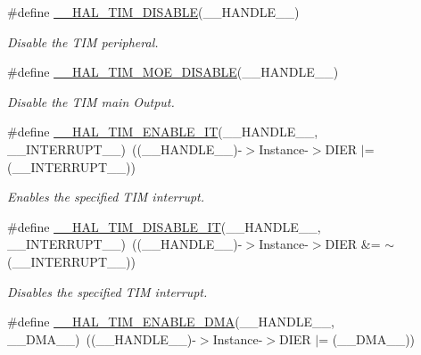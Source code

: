 \begin{DoxyCompactItemize}
\#define \hyperlink{group___t_i_m___exported___macros_ga6a5e653e0e06a04151b74eb1a5f96eb6}{\+\_\+\+\_\+\+H\+A\+L\+\_\+\+T\+I\+M\+\_\+\+D\+I\+S\+A\+B\+LE}(\+\_\+\+\_\+\+H\+A\+N\+D\+L\+E\+\_\+\+\_\+)
\begin{DoxyCompactList}\small\item\em Disable the T\+IM peripheral. \end{DoxyCompactList}\item 
\#define \hyperlink{group___t_i_m___exported___macros_ga69d63e147faeca8909e9679f684c0325}{\+\_\+\+\_\+\+H\+A\+L\+\_\+\+T\+I\+M\+\_\+\+M\+O\+E\+\_\+\+D\+I\+S\+A\+B\+LE}(\+\_\+\+\_\+\+H\+A\+N\+D\+L\+E\+\_\+\+\_\+)
\begin{DoxyCompactList}\small\item\em Disable the T\+IM main Output. \end{DoxyCompactList}\item 
\#define \hyperlink{group___t_i_m___exported___macros_ga4d69943bc4716743c78e3194e259097e}{\+\_\+\+\_\+\+H\+A\+L\+\_\+\+T\+I\+M\+\_\+\+E\+N\+A\+B\+L\+E\+\_\+\+IT}(\+\_\+\+\_\+\+H\+A\+N\+D\+L\+E\+\_\+\+\_\+,  \+\_\+\+\_\+\+I\+N\+T\+E\+R\+R\+U\+P\+T\+\_\+\+\_\+)~((\+\_\+\+\_\+\+H\+A\+N\+D\+L\+E\+\_\+\+\_\+)-\/$>$Instance-\/$>$D\+I\+ER $\vert$= (\+\_\+\+\_\+\+I\+N\+T\+E\+R\+R\+U\+P\+T\+\_\+\+\_\+))
\begin{DoxyCompactList}\small\item\em Enables the specified T\+IM interrupt. \end{DoxyCompactList}\item 
\#define \hyperlink{group___t_i_m___exported___macros_ga31d67e905bc62e3142179dc4bbf8ba64}{\+\_\+\+\_\+\+H\+A\+L\+\_\+\+T\+I\+M\+\_\+\+D\+I\+S\+A\+B\+L\+E\+\_\+\+IT}(\+\_\+\+\_\+\+H\+A\+N\+D\+L\+E\+\_\+\+\_\+,  \+\_\+\+\_\+\+I\+N\+T\+E\+R\+R\+U\+P\+T\+\_\+\+\_\+)~((\+\_\+\+\_\+\+H\+A\+N\+D\+L\+E\+\_\+\+\_\+)-\/$>$Instance-\/$>$D\+I\+ER \&= $\sim$(\+\_\+\+\_\+\+I\+N\+T\+E\+R\+R\+U\+P\+T\+\_\+\+\_\+))
\begin{DoxyCompactList}\small\item\em Disables the specified T\+IM interrupt. \end{DoxyCompactList}\item 
\#define \hyperlink{group___t_i_m___exported___macros_gabb91ccd46cd7204c87170a1ea5b38135}{\+\_\+\+\_\+\+H\+A\+L\+\_\+\+T\+I\+M\+\_\+\+E\+N\+A\+B\+L\+E\+\_\+\+D\+MA}(\+\_\+\+\_\+\+H\+A\+N\+D\+L\+E\+\_\+\+\_\+,  \+\_\+\+\_\+\+D\+M\+A\+\_\+\+\_\+)~((\+\_\+\+\_\+\+H\+A\+N\+D\+L\+E\+\_\+\+\_\+)-\/$>$Instance-\/$>$D\+I\+ER $\vert$= (\+\_\+\+\_\+\+D\+M\+A\+\_\+\+\_\+))

\end{DoxyCompactItemize}
